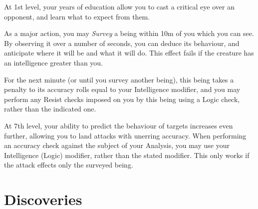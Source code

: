 {
At 1st level, your years of education allow you to cast a critical eye over an opponent, and learn what to expect from them. 

As a major action, you may {\it Survey} a being within 10m of you which you can see. By observing it over a number of seconds, you can deduce its behaviour, and anticipate where it will be and what it will do. This effect fails if the creature has an intelligence greater than you. 

For the next minute (or until you survey another being), this being takes a penalty to its accuracy rolls equal to your Intelligence modifier, and you may perform any Resist checks imposed on you by this being using a Logic check, rather than the indicated one. 


At 7th level, your ability to predict the behaviour of targets increases even further, allowing you to land attacks with unerring accuracy. When performing an accuracy check against the subject of your Analysis, you may use your Intelligence (Logic) modifier, rather than the stated modifier. This only works if the attack effects only the surveyed being. 
}



\section*{Discoveries}

\newcommand\discovery[5]{
\subsubsection{\textit{ \textbf{#1}}}
{\setlength\parskip{5 pt}
\if#21
	{\it Prerequisite: #3}
\fi

#4

#5
}
}

